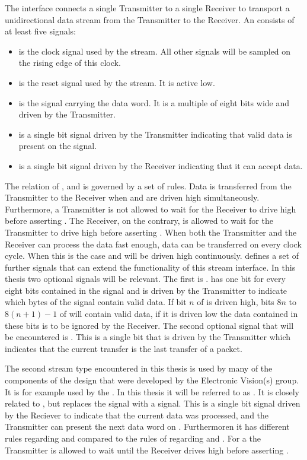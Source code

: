 The \AXIStream{} interface connects a single Transmitter to a single Receiver to transport a unidirectional data stream from the Transmitter to the Receiver. An \AXIStream{} consists of at least five signals:
\begin{itemize}
    \item \ACLK{} is the clock signal used by the stream. All other signals will be sampled on the rising edge of this clock.
    \item \ARESETn{} is the reset signal used by the stream. It is active low.
    \item \TDATA{} is the signal carrying the data word. It is a multiple of eight bits wide and driven by the Transmitter.
    \item \TVALID{} is a single bit signal driven by the Transmitter indicating that valid data is present on the \TDATA{} signal.
    \item \TREADY{} is a single bit signal driven by the Receiver indicating that it can accept data.
\end{itemize}
The relation of \TDATA{}, \TVALID{} and \TREADY{} is governed by a set of rules.
Data is transferred from the Transmitter to the Receiver when \TREADY{} and \TVALID{} are driven high simultaneously.
Furthermore, a Transmitter is not allowed to wait for the Receiver to drive \TREADY{} high before asserting \TVALID{}. The Receiver, on the contrary, is allowed to wait for the Transmitter to drive \TVALID{} high before asserting \TREADY{}.
When both the Transmitter and the Receiver can process the data fast enough, data can be transferred on every clock cycle. When this is the case \TREADY{} and \TVALID{} will be driven high continuously.
\AXIStream{} defines a set of further signals that can extend the functionality of this stream interface. In this thesis two optional signals will be relevant.
The first is \TKEEP{}. \TKEEP{} has one bit for every eight bits contained in the \TDATA{} signal and is driven by the Transmitter to indicate which bytes of the \TDATA{} signal contain valid data.
If bit $n$ of \TKEEP{} is driven high, bits $8n$ to $8(n + 1) - 1$ of \TDATA{} will contain valid data, if it is driven low the data contained in these bits is to be ignored by the Receiver.
The second optional signal that will be encountered is \TLAST{}. This is a single bit that is driven by the Transmitter which indicates that the current transfer is the last transfer of a packet.

The second stream type encountered in this thesis is used by many of the components of the \FPGA{} design that were developed by the Electronic Vision(s) group. It is for example used by the \pbexec{}. In this thesis it will be referred to as \ValidNextStream{}. It is closely related to \AXIStream{}, but replaces the \TREADY{} signal with a \NEXT{} signal.
This is a single bit signal driven by the Reciever to indicate that the current data was processed, and the Transmitter can present the next data word on \TDATA{}. Furthermoren it has different rules regarding \TVALID{} and \NEXT{} compared to the rules of regarding \TVALID{} and \TREADY{}.
For a \ValidNextStream{} the Transmitter is allowed to wait until the Receiver drives \NEXT{} high before asserting \TVALID{}.

